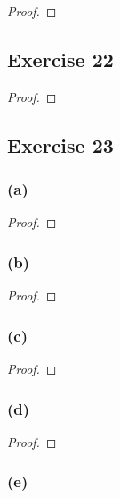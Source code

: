 \documentclass[14pt]{extarticle}
\begin{document}
\begin{proof}

\end{proof}

\subsection{Exercise 22}

\begin{proof}

\end{proof}

\subsection{Exercise 23}

\subsubsection{(a)}

\begin{proof}

\end{proof}

\subsubsection{(b)}

\begin{proof}

\end{proof}

\subsubsection{(c)}

\begin{proof}

\end{proof}

\subsubsection{(d)}

\begin{proof}

\end{proof}

\subsubsection{(e)}
\end{document}
